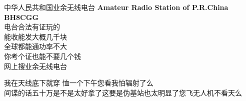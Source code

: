 \documentclass{article}
\begin{document}
\thispagestyle{empty} 
\begin{center}
	\begin{spacing}{5}
	\begin{scaletowidth}{0.9\textwidth}
		中华人民共和国业余无线电台 \textbf{\large{A}\normalsize{mateur} \large{R}\normalsize{adio} \large{S}\normalsize{tation of P.R.China}} \\
		\sffamily \textbf{BH8CGG} \rmfamily \\
		电台\quad 合法\quad 有证\quad 玩的 \\
		能收能发\quad 大概几千块 \\
		全球都能通\quad 功率不大 \\
		你考个证也能\quad 不要几个钱 \\
		网上搜\quad 业余无线电台 \\
	\end{scaletowidth}
	\end{spacing}
	\vspace*{-1.5cm}
	\begin{spacing}{2}
	\begin{scaletowidth}{0.9\textwidth}
		我在天线底下就穿 \rmfamily 恤一个下午\quad 您看我怕辐射了么\\
		间谍的话五十万是不是太好拿了\quad 这要是伪基站也太明显了\quad 您飞无人机不看天么\\
	\end{scaletowidth}
	\end{spacing}
\end{center}
\end{document}
